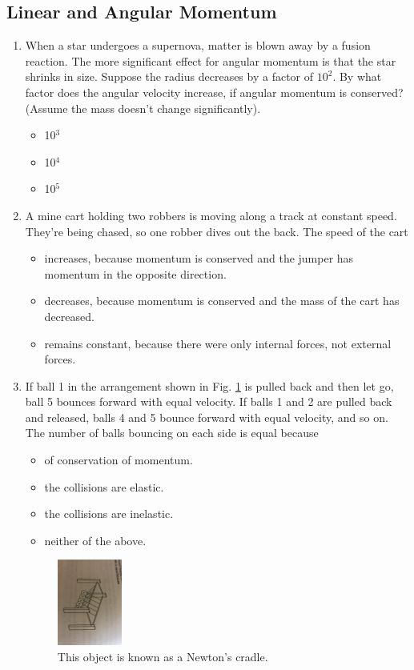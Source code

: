 \documentclass[10pt]{article}
\begin{document}
\subsection{Linear and Angular Momentum}
\begin{enumerate}
\item When a star undergoes a supernova, matter is blown away by a fusion reaction.  The more significant effect for angular momentum is that the star shrinks in size.  Suppose the radius decreases by a factor of $10^2$.  By what factor does the angular velocity increase, if angular momentum is conserved? (Assume the mass doesn't change significantly).
\begin{itemize}
\item 10$^3$
\item 10$^4$
\item 10$^5$
\end{itemize}
\item A mine cart holding two robbers is moving along a track at constant speed.  They're being chased, so one robber dives out the back.  The speed of the cart
\begin{itemize}
\item increases, because momentum is conserved and the jumper has momentum in the opposite direction.
\item decreases, because momentum is conserved and the mass of the cart has decreased.
\item remains constant, because there were only internal forces, not external forces.
\end{itemize}
\item If ball 1 in the arrangement shown in Fig. \ref{fig:newton} is pulled back and then let go, ball 5 bounces forward with equal velocity.  If balls 1 and 2 are pulled back and released, balls 4 and 5 bounce forward with equal velocity, and so on.  The number of balls bouncing on each side is equal because
\begin{itemize}
\item of conservation of momentum.
\item the collisions are elastic.
\item the collisions are inelastic.
\item neither of the above.
\end{itemize}
\begin{figure}
\centering
\includegraphics[width=0.2\textwidth,trim=20cm 5cm 15cm 20cm,clip=true]{newton.jpeg}
\caption{\label{fig:newton} This object is known as a Newton's cradle.}
\end{figure}
\end{enumerate}
\end{document}
